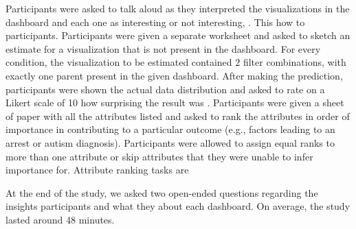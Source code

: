 Participants were asked to talk aloud
as they interpreted the visualizations
in the dashboard and 
each one as interesting or
not interesting, .
This 
how 
to participants. %
Participants were given a separate worksheet
and asked to sketch an estimate for a visualization
that is not present in the dashboard.
For every condition, the visualization to be estimated
contained $2$ filter combinations,
with exactly one parent present in the given dashboard.
After making the prediction,
participants were shown the actual data
distribution and asked to rate on a Likert scale
of 10 how surprising the result was
.
Participants were given a sheet of paper
with all the attributes listed
and asked to rank the attributes
in order of importance in contributing
to a particular outcome
(e.g., factors leading to an arrest or autism diagnosis).
Participants were allowed to assign equal ranks to more than one attribute or skip attributes that they were unable to infer importance for.
Attribute ranking tasks are %
\smallskip
\par At the end of the study, we asked two open-ended questions regarding the insights  participants and what they  about each dashboard. On average, the study lasted around 48 minutes.
